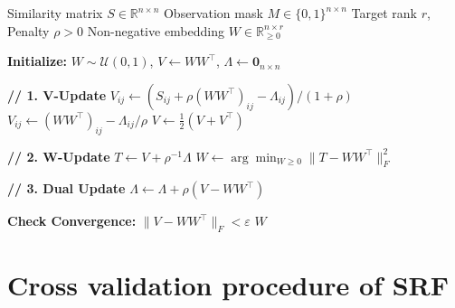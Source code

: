 \documentclass{article}
\begin{document}
\begin{algorithm}[!ht]
\caption{Similarity-based Representation Factorization (SRF)}
\begin{algorithmic}[1]
\Require
    \State Similarity matrix $S \in \mathbb{R}^{n \times n}$
    \State Observation mask $M \in \{0,1\}^{n \times n}$
    \State Target rank $r$, Penalty $\rho > 0$
\Ensure Non-negative embedding $W \in \mathbb{R}^{n \times r}_{\ge 0}$

\State \textbf{Initialize:} $W \sim \mathcal{U}(0,1)$, $V \leftarrow W W^\top$, $\Lambda \leftarrow \mathbf{0}_{n \times n}$

    \Statex \hspace{-1.5em} \textbf{// 1. V-Update}
            \State $V_{ij} \leftarrow (S_{ij} + \rho (W W^\top)_{ij} - \Lambda_{ij}) / (1+\rho)$
        \Else {}
            \State $V_{ij} \leftarrow (W W^\top)_{ij} - \Lambda_{ij}/\rho$
        \EndIf
    \EndFor
    \State $V \leftarrow \frac{1}{2}(V + V^\top)$ 

    \Statex \hspace{-1.5em} \textbf{// 2. W-Update}
    \State $T \leftarrow V + \rho^{-1}\Lambda$ 
    \State $W \leftarrow \arg\min_{W \ge 0} \|T - W W^\top\|_F^2$ 

    \Statex \hspace{-1.5em} \textbf{// 3. Dual Update}
    \State $\Lambda \leftarrow \Lambda + \rho(V - W W^\top)$

    \State \textbf{Check Convergence:} $\|V - WW^\top\|_F < \varepsilon$
\EndWhile
\State \Return $W$
\end{algorithmic}
\end{algorithm}



\section{Cross validation procedure of SRF}\label{sec:cross-validation}

\end{document}
